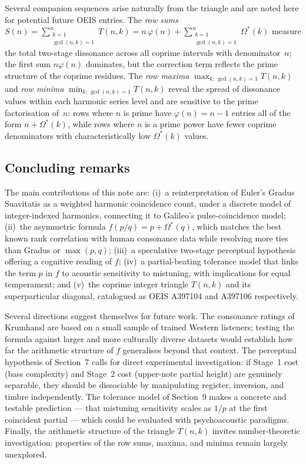 \documentclass[11pt,a4paper]{article}
\newcommand{\Os}{\Omega^{\!*}}
\begin{document}
Several companion sequences arise naturally from the triangle and are noted
here for potential future OEIS entries. The \emph{row sums}
$S(n) = \sum_{\substack{k=1\\\gcd(n,k)=1}}^{n} T(n,k)
       = n\,\varphi(n) + \sum_{\substack{k=1\\\gcd(n,k)=1}}^{n} \Os(k)$
measure the total two-stage dissonance across all coprime intervals with
denominator~$n$; the first sum $n\varphi(n)$ dominates, but the correction
term reflects the prime structure of the coprime residues. The \emph{row
maxima} $\max_{k:\,\gcd(n,k)=1} T(n,k)$ and \emph{row minima}
$\min_{k:\,\gcd(n,k)=1} T(n,k)$ reveal the spread of dissonance values
within each harmonic series level and are sensitive to the prime
factorisation of~$n$: rows where $n$ is prime have $\varphi(n)=n-1$ entries
all of the form $n + \Os(k)$, while rows where $n$ is a prime power have
fewer coprime denominators with characteristically low $\Os(k)$ values.


\subsection*{Concluding remarks}

The main contributions of this note are: (i)~a reinterpretation of Euler's
Gradus Suavitatis as a weighted harmonic coincidence count, under a
discrete model of integer-indexed harmonics, connecting it to Galileo's
pulse-coincidence model; (ii)~the asymmetric formula $f(p/q) = p + \Os(q)$,
which matches the best known rank correlation with human consonance data while
resolving more ties than Gradus or $\max(p,q)$; (iii)~a speculative two-stage
perceptual hypothesis offering a cognitive reading of $f$; (iv)~a
partial-beating tolerance model that links the term $p$ in $f$ to acoustic
sensitivity to mistuning, with implications for equal temperament; and
(v)~the coprime integer triangle $T(n,k)$ and its superparticular diagonal,
catalogued as OEIS A397104 and A397106 respectively.

Several directions suggest themselves for future work. The consonance ratings
of Krumhansl \cite{krumhansl1990} are based on a small sample of trained
Western listeners; testing the formula against larger and more culturally
diverse datasets \cite{mcdermott2016,bowling2018} would establish how far
the arithmetic structure of $f$ generalises beyond that context. The
perceptual hypothesis of Section~7 calls for direct experimental investigation:
if Stage~1 cost (bass complexity) and Stage~2 cost (upper-note partial height)
are genuinely separable, they should be dissociable by manipulating register,
inversion, and timbre independently. The tolerance model of Section~9 makes a
concrete and testable prediction --- that mistuning sensitivity scales as
$1/p$ at the first coincident partial --- which could be evaluated with
psychoacoustic paradigms. Finally, the arithmetic structure of the triangle
$T(n,k)$ invites number-theoretic investigation: properties of the row sums,
maxima, and minima remain largely unexplored.
\end{document}
